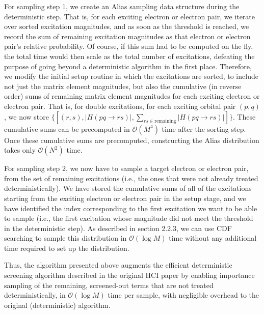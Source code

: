 \documentclass[english]{article}
\begin{document}
For sampling step 1, we create an Alias sampling data structure during the deterministic step. That is, for each exciting electron or electron pair, we iterate over sorted excitation magnitudes, and as soon as the threshold is reached, we record the sum of remaining excitation magnitudes as that electron or electron pair's relative probability. Of course, if this sum had to be computed on the fly, the total time would then scale as the total number of excitations, defeating the purpose of going beyond a deterministic algorithm in the first place. Therefore, we modify the initial setup routine in which the excitations are sorted, to include not just the matrix element magnitudes, but also the cumulative (in reverse order) sums of remaining matrix element magnitudes for each exciting electron or electron pair. That is, for double excitations, for each exciting orbital pair $(p,q)$, we now store $\{[(r,s), |H(pq\rightarrow rs)|, \sum_{rs\in\textrm{remaining}}|H(pq\rightarrow rs)|]\}$. These cumulative sums can be precomputed in $\mathcal{O}(M^4)$ time after the sorting step. Once these cumulative sums are precomputed, constructing the Alias distribution takes only $\mathcal{O}(N^2)$ time.

For sampling step 2, we now have to sample a target electron or electron pair, from the set of remaining excitations (i.e., the ones that were not already treated deterministically). We have stored the cumulative sums of all of the excitations starting from the exciting electron or electron pair in the setup stage, and we have identified the index corresponding to the first excitation we want to be able to sample (i.e., the first excitation whose magnitude did not meet the threshold in the deterministic step). As described in section 2.2.3, we can use CDF searching to sample this distribution in $\mathcal{O}(\log M)$ time without any additional time required to set up the distribution.

Thus, the algorithm presented above augments the efficient deterministic screening algorithm described in the original HCI paper by enabling importance sampling of the remaining, screened-out terms that are not treated deterministically, in $\mathcal{O}(\log M)$ time per sample, with negligible overhead to the original (deterministic) algorithm.
\end{document}
